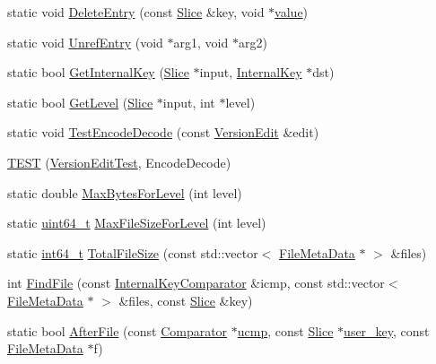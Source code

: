 \begin{DoxyCompactItemize}
\item 
static void \hyperlink{namespaceleveldb_ae1152d734df7c3bdf050111f0049cd7c}{Delete\-Entry} (const \hyperlink{classleveldb_1_1_slice}{Slice} \&key, void $\ast$\hyperlink{cache_8cc_a0f61d63b009d0880a89c843bd50d8d76}{value})
\item 
static void \hyperlink{namespaceleveldb_a623e7ee79df088f3d37ebf5b55c906ba}{Unref\-Entry} (void $\ast$arg1, void $\ast$arg2)
\item 
static bool \hyperlink{namespaceleveldb_a83eb9464b52905f9a56f8f0d5437c3c2}{Get\-Internal\-Key} (\hyperlink{classleveldb_1_1_slice}{Slice} $\ast$input, \hyperlink{classleveldb_1_1_internal_key}{Internal\-Key} $\ast$dst)
\item 
static bool \hyperlink{namespaceleveldb_afc2dfe267c7cd8d678021e2752f336e9}{Get\-Level} (\hyperlink{classleveldb_1_1_slice}{Slice} $\ast$input, int $\ast$level)
\item 
static void \hyperlink{namespaceleveldb_a435e5ce2b770dd30fffe979090145e0e}{Test\-Encode\-Decode} (const \hyperlink{classleveldb_1_1_version_edit}{Version\-Edit} \&edit)
\item 
\hyperlink{namespaceleveldb_aa3106d7d6e907fc13c8c7ceed76740ad}{T\-E\-S\-T} (\hyperlink{classleveldb_1_1_version_edit_test}{Version\-Edit\-Test}, Encode\-Decode)
\item 
static double \hyperlink{namespaceleveldb_ad627c8c010aab67e9ea44dd73f98e31d}{Max\-Bytes\-For\-Level} (int level)
\item 
static \hyperlink{stdint_8h_aaa5d1cd013383c889537491c3cfd9aad}{uint64\-\_\-t} \hyperlink{namespaceleveldb_a670e043671728f7aa2dd991c2b2b7139}{Max\-File\-Size\-For\-Level} (int level)
\item 
static \hyperlink{stdint_8h_adec1df1b8b51cb32b77e5b86fff46471}{int64\-\_\-t} \hyperlink{namespaceleveldb_a8d7291b08be6643bcfb46c475f779f9e}{Total\-File\-Size} (const std\-::vector$<$ \hyperlink{structleveldb_1_1_file_meta_data}{File\-Meta\-Data} $\ast$ $>$ \&files)
\item 
int \hyperlink{namespaceleveldb_a812c4c6cf8299e767535a59f2205df0c}{Find\-File} (const \hyperlink{classleveldb_1_1_internal_key_comparator}{Internal\-Key\-Comparator} \&icmp, const std\-::vector$<$ \hyperlink{structleveldb_1_1_file_meta_data}{File\-Meta\-Data} $\ast$ $>$ \&files, const \hyperlink{classleveldb_1_1_slice}{Slice} \&key)
\item 
static bool \hyperlink{namespaceleveldb_a7f9c247b8bae634426f95a6a4443ebfc}{After\-File} (const \hyperlink{structleveldb_1_1_comparator}{Comparator} $\ast$\hyperlink{version__set_8cc_a598e50ba29b234ea6ee753e383e79452}{ucmp}, const \hyperlink{classleveldb_1_1_slice}{Slice} $\ast$\hyperlink{version__set_8cc_afced2118ae0bf03db7c7e75a21cfd004}{user\-\_\-key}, const \hyperlink{structleveldb_1_1_file_meta_data}{File\-Meta\-Data} $\ast$f)

\end{DoxyCompactItemize}
